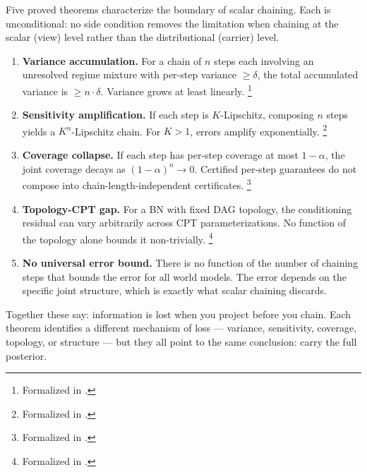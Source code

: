 \documentclass[11pt,openany]{report}
\begin{document}
Five proved theorems characterize the boundary of scalar chaining.
Each is unconditional: no side condition removes the limitation when
chaining at the scalar (view) level rather than the distributional
(carrier) level.

\begin{enumerate}
\item \textbf{Variance accumulation.}  For a chain of $n$ steps each
  involving an unresolved regime mixture with per-step variance
  $\ge \delta$, the total accumulated variance is
  $\ge n \cdot \delta$.  Variance grows at least linearly.%
  \footnote{Formalized in
  .}

\item \textbf{Sensitivity amplification.}  If each step is
  $K$-Lipschitz, composing $n$ steps yields a $K^n$-Lipschitz chain.
  For $K > 1$, errors amplify exponentially.%
  \footnote{Formalized in
  .}

\item \textbf{Coverage collapse.}  If each step has per-step
  coverage at most $1 - \alpha$, the joint coverage decays as
  $(1 - \alpha)^n \to 0$.  Certified per-step guarantees do not
  compose into chain-length-independent certificates.%
  \footnote{Formalized in
  .}

\item \textbf{Topology-CPT gap.}  For a BN with fixed DAG topology,
  the conditioning residual can vary arbitrarily across CPT
  parameterizations.  No function of the topology alone bounds
  it non-trivially.%
  \footnote{Formalized in
  .}

\item \textbf{No universal error bound.}  There is no function of
  the number of chaining steps that bounds the error for all world
  models.  The error depends on the specific joint structure, which
  is exactly what scalar chaining discards.
\end{enumerate}

\noindent
Together these say: information is lost when you project before you
chain.  Each theorem identifies a different mechanism of loss ---
variance, sensitivity, coverage, topology, or structure --- but they
all point to the same conclusion: carry the full posterior.
\end{document}
